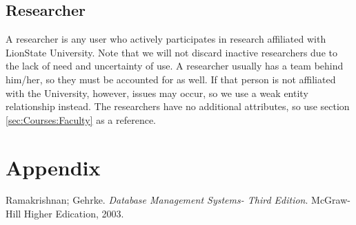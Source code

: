 \documentclass{article}
\begin{document}
  \subsection{Researcher}\label{sec:Courses:Researcher}
    A researcher is any user who actively participates in research affiliated with LionState University.  Note that we will not discard inactive researchers due to the lack of need and uncertainty of use.  A researcher usually has a team behind him/her, so they must be accounted for as well.  If that person is not affiliated with the University, however, issues may occur, so we use a weak entity relationship instead.
    The researchers have no additional attributes, so use section \ref{sec:Courses:Faculty} as a reference.

  \newpage


  \section{Appendix}\label{sec:Appendix}

  \medskip


  \begin{thebibliography}{1}

    Ramakrishnan; Gehrke.
    \textit{Database Management Systems- Third Edition}.
    McGraw-Hill Higher Edication, 2003.

  \end{thebibliography}
\end{document}
